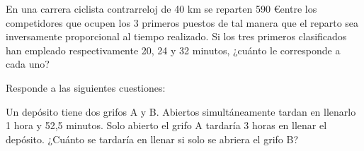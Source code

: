 \documentclass[addpoints,spanish, 12pt,a4paper]{exam}
\begin{document}
\begin{questions}
\question[1] En una carrera ciclista contrarreloj de 40 km se reparten 590 \euro entre los competidores que ocupen los 3 primeros puestos de tal manera que el reparto sea inversamente proporcional al tiempo realizado. Si los tres primeros clasificados han empleado respectivamente 20, 24 y 32 minutos, ¿cuánto le corresponde a cada uno?


\question[1] Responde a las siguientes cuestiones:

\question[1] Un depósito tiene dos grifos A y B. Abiertos simultáneamente tardan en llenarlo 1 hora y 52,5 minutos. Solo abierto el grifo A tardaría 3 horas en llenar el depósito. ¿Cuánto se tardaría en llenar si solo se abriera el grifo B?



\end{questions}
\end{document}

